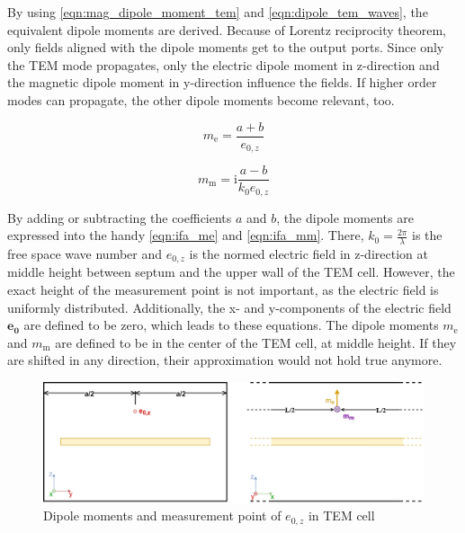 
By using \autoref{eqn:mag_dipole_moment_tem} and \autoref{eqn:dipole_tem_waves}, the equivalent dipole moments are derived. Because of Lorentz reciprocity theorem, only fields aligned with the dipole moments get to the output ports. Since only the TEM mode propagates, only the electric dipole moment in z-direction and the magnetic dipole moment in y-direction influence the fields. If higher order modes can propagate, the other dipole moments become relevant, too.



\begin{equation}
    m_{\mathrm{e}}=\frac{a+b}{e_{0,z}}
    \label{eqn:ifa_me}
\end{equation}

\begin{equation}
    m_{\mathrm{m}}=\mathrm{i}\frac{a-b}{k_0  e_{0,z}}
    \label{eqn:ifa_mm}
\end{equation}

By adding or subtracting the coefficients $a$ and $b$, the dipole moments are expressed into the handy \autoref{eqn:ifa_me} and \autoref{eqn:ifa_mm}. There, $k_0=\frac{2\pi}{\lambda}$ is the free space wave number and $e_{0,z}$ is the normed electric field in z-direction at middle height between septum and the upper wall of the TEM cell. However, the exact height of the measurement point is not important, as the electric field is uniformly distributed. Additionally, the x- and y-components of the electric field $\mathbf{e_{0}}$ are defined to be zero, which leads to these equations. The dipole moments $m_{\mathrm{e}}$ and $m_{\mathrm{m}}$ are defined to be in the center of the TEM cell, at middle height. If they are shifted in any direction, their approximation would not hold true anymore.

\begin{figure}[h]
    \centering
    \includegraphics[width=1\linewidth]{Documentation//content//30_simulations//img/sketch_dipoles_tem_cell.png}
    \caption{Dipole moments and measurement point of $e_{0,z}$ in TEM cell}
    \label{fig:sketch_dipoles_tem_cell}
\end{figure}

